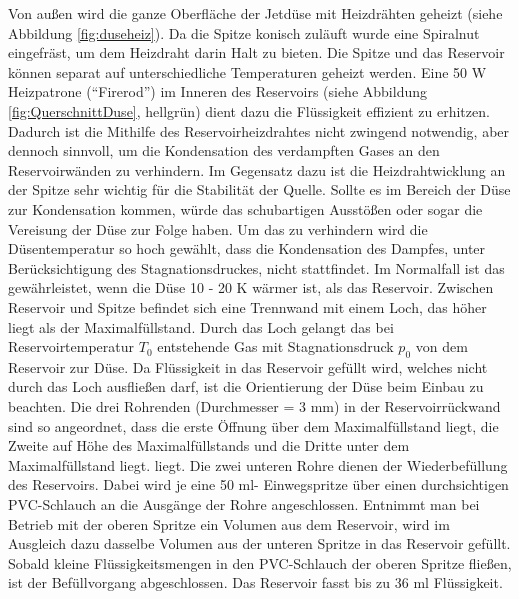 Von außen wird die ganze Oberfläche der Jetdüse mit Heizdrähten geheizt (siehe Abbildung \ref{fig:duseheiz}). Da die Spitze konisch zuläuft wurde eine Spiralnut eingefräst, um dem Heizdraht darin Halt zu bieten. Die Spitze und das Reservoir können separat auf unterschiedliche Temperaturen geheizt werden. Eine 50 W Heizpatrone (\enquote{Firerod}) im Inneren des Reservoirs (siehe Abbildung \ref{fig:QuerschnittDuse}, hellgrün) dient dazu die Flüssigkeit effizient zu erhitzen. Dadurch ist die Mithilfe des Reservoirheizdrahtes nicht zwingend notwendig, aber dennoch sinnvoll, um die Kondensation des verdampften Gases an den Reservoirwänden zu verhindern. Im Gegensatz dazu ist die Heizdrahtwicklung an der Spitze sehr wichtig für die Stabilität der Quelle. Sollte es im Bereich der Düse zur Kondensation kommen, würde das schubartigen Ausstößen oder sogar die Vereisung der Düse zur Folge haben. Um das zu verhindern wird die Düsentemperatur so hoch gewählt, dass die Kondensation des Dampfes, unter Berücksichtigung des Stagnationsdruckes, nicht stattfindet. Im Normalfall ist das gewährleistet, wenn die Düse 10 - 20 K wärmer ist, als das Reservoir.
Zwischen Reservoir und Spitze befindet sich eine Trennwand mit einem Loch, das höher liegt als der Maximalfüllstand. Durch das Loch gelangt das bei Reservoirtemperatur $T_0$ entstehende Gas mit Stagnationsdruck $p_0$ von dem Reservoir zur Düse. 
Da Flüssigkeit in das Reservoir gefüllt wird, welches nicht durch das Loch ausfließen darf, ist die Orientierung der Düse beim Einbau zu beachten. Die drei Rohrenden (Durchmesser = 3 mm) in der Reservoirrückwand sind so angeordnet, dass die erste Öffnung über dem Maximalfüllstand liegt, die Zweite auf Höhe des Maximalfüllstands und die Dritte unter dem Maximalfüllstand liegt. liegt. Die zwei unteren Rohre dienen der Wiederbefüllung des Reservoirs. Dabei wird je eine 50 ml- Einwegspritze über einen durchsichtigen PVC-Schlauch an die Ausgänge der Rohre angeschlossen. Entnimmt man bei Betrieb mit der oberen Spritze ein Volumen aus dem Reservoir, wird im Ausgleich dazu dasselbe Volumen aus der unteren Spritze in das Reservoir gefüllt. Sobald kleine Flüssigkeitsmengen in den PVC-Schlauch der oberen Spritze fließen, ist der Befüllvorgang abgeschlossen. Das Reservoir fasst bis zu 36 ml Flüssigkeit. 
